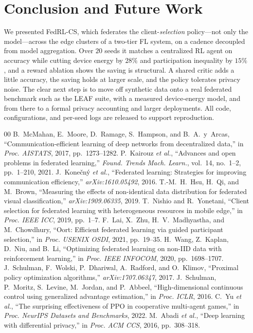 \documentclass[conference]{IEEEtran}
\begin{document}
\section{Conclusion and Future Work}
We presented FedRL-CS, which federates the client-\emph{selection} policy---not
only the model---across the edge clusters of a two-tier FL system, on a cadence
decoupled from model aggregation. Over $20$ seeds it matches a centralized RL agent
on accuracy while cutting device energy by $28\%$ and participation inequality by
$15\%$, and a reward ablation shows the saving is structural. A shared critic adds
a little accuracy, the saving holds at larger scale, and the policy tolerates
privacy noise. The clear next step is to move off synthetic data onto a real
federated benchmark such as the LEAF suite, with a measured device-energy model,
and from there to a formal privacy accounting and larger deployments. All code,
configurations, and per-seed logs are released to support reproduction.

\begin{thebibliography}{00}
 B.~McMahan, E.~Moore, D.~Ramage, S.~Hampson, and
B.~A.~y~Arcas, ``Communication-efficient learning of deep networks from
decentralized data,'' in \emph{Proc. AISTATS}, 2017, pp.~1273--1282.
 P.~Kairouz \emph{et al.}, ``Advances and open problems in
federated learning,'' \emph{Found. Trends Mach. Learn.}, vol.~14, no.~1--2,
pp.~1--210, 2021.
 J.~Kone\v{c}n\'y \emph{et al.}, ``Federated learning:
Strategies for improving communication efficiency,'' \emph{arXiv:1610.05492},
2016.
 T.-M.~H.~Hsu, H.~Qi, and M.~Brown, ``Measuring the effects of
non-identical data distribution for federated visual classification,''
\emph{arXiv:1909.06335}, 2019.
 T.~Nishio and R.~Yonetani, ``Client selection for federated
learning with heterogeneous resources in mobile edge,'' in \emph{Proc. IEEE ICC},
2019, pp.~1--7.
 F.~Lai, X.~Zhu, H.~V.~Madhyastha, and M.~Chowdhury, ``Oort:
Efficient federated learning via guided participant selection,'' in \emph{Proc.
USENIX OSDI}, 2021, pp.~19--35.
 H.~Wang, Z.~Kaplan, D.~Niu, and B.~Li, ``Optimizing federated
learning on non-IID data with reinforcement learning,'' in \emph{Proc. IEEE
INFOCOM}, 2020, pp.~1698--1707.
 J.~Schulman, F.~Wolski, P.~Dhariwal, A.~Radford, and
O.~Klimov, ``Proximal policy optimization algorithms,'' \emph{arXiv:1707.06347},
2017.
 J.~Schulman, P.~Moritz, S.~Levine, M.~Jordan, and P.~Abbeel,
``High-dimensional continuous control using generalized advantage estimation,'' in
\emph{Proc. ICLR}, 2016.
 C.~Yu \emph{et al.}, ``The surprising effectiveness of PPO in
cooperative multi-agent games,'' in \emph{Proc. NeurIPS Datasets and Benchmarks},
2022.
 M.~Abadi \emph{et al.}, ``Deep learning with differential
privacy,'' in \emph{Proc. ACM CCS}, 2016, pp.~308--318.
\end{thebibliography}
\end{document}
